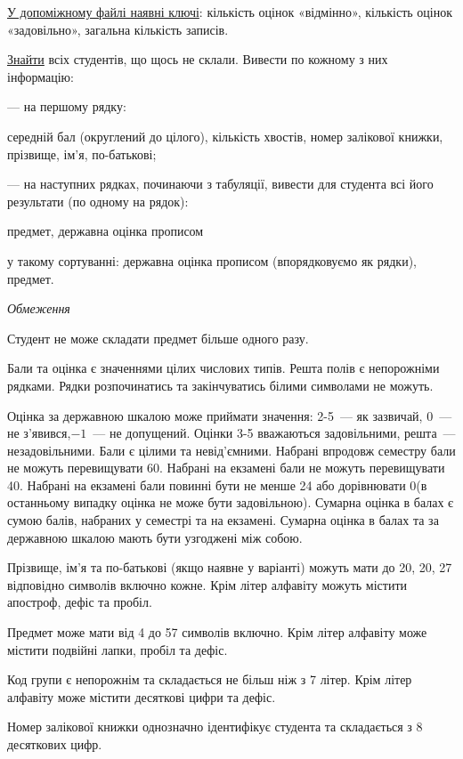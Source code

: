 \documentclass[11pt, ukrainian]{article}
\begin{document}
\underline{У допоміжному файлі наявні ключі}: кількість оцінок «відмінно», кількість оцінок «задовільно», загальна кількість записів.

\underline{Знайти} всіх студентів, що щось не склали. Вивести по кожному з них інформацію:\par
{\noindent}--- на першому рядку:\par
середній бал (округлений до цілого), кількість хвостів, номер залікової книжки, прізвище, ім’я, по-батькові;

{\noindent}--- на наступних рядках, починаючи з табуляції, вивести для студента всі його результати (по одному на рядок):\par
предмет, державна оцінка прописом

{\noindent}у такому сортуванні: державна оцінка прописом (впорядковуємо як рядки), предмет.


\bigskip\textit{Обмеження}

Студент не може складати предмет більше одного разу.

Бали та оцінка є значеннями цілих числових типів. Решта полів є непорожніми рядками.
Рядки розпочинатись та закінчуватись білими символами не можуть.

Оцінка за державною шкалою може приймати значення: 2-5~--- як зазвичай, 0~--- не з’явився,$-1$~--- не допущений. 
Оцінки 3-5 вважаються задовільними, решта~--- незадовільними. 
Бали є цілими та невід’ємними.
Набрані впродовж семестру бали не можуть перевищувати 60. 
Набрані на екзамені бали не можуть перевищувати 40. 
Набрані на екзамені бали повинні бути не менше 24 або дорівнювати 0(в останньому випадку оцінка не може бути задовільною). 
Сумарна оцінка в балах є сумою балів, набраних у семестрі та на екзамені.
Сумарна оцінка в балах та за державною шкалою мають бути узгоджені між собою.

Прізвище, ім’я та по-батькові (якщо наявне у варіанті) можуть мати до 20, 20, 27 відповідно символів включно кожне. 
Крім літер алфавіту можуть містити апостроф, дефіс та пробіл.

Предмет може мати від 4 до 57 символів включно. 
Крім літер алфавіту може містити подвійні лапки, пробіл та дефіс.

Код групи є непорожнім та складається не більш ніж з 7 літер. 
Крім літер алфавіту може містити десяткові цифри та дефіс.


Номер залікової книжки однозначно ідентифікує студента та складається з 8 десяткових цифр. 
\end{document}
